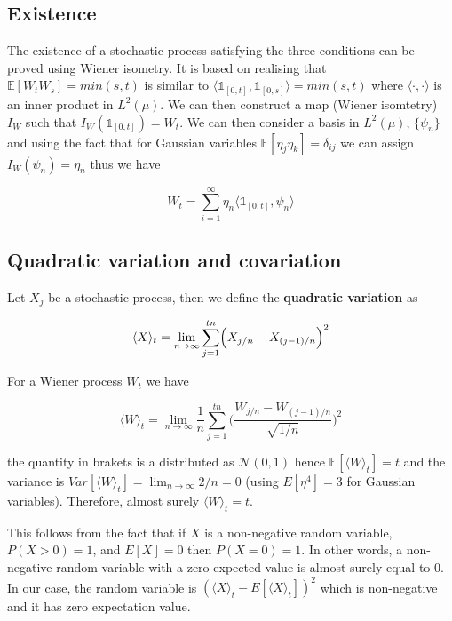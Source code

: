 \documentclass[11pt,a4paper]{article}
\begin{document}
\subsection{Existence}

The existence of a stochastic process satisfying the three conditions can be proved using Wiener isometry. It is based on realising that $\mathbb{E}[W_tW_s] = min(s,t)$ is similar to $\langle \mathds{1}_{[0,t]},\mathds{1}_{[0,s]} \rangle = min(s,t)$ where $\langle \cdot, \cdot\rangle$ is an inner product in $L^2(\mu)$. We can then construct a map (Wiener isomtetry) $I_{W}$ such that $I_W(\mathds{1}_{[0,t]}) = W_t$. We can then consider a basis in $L^2(\mu)$, $\{\psi_n\}$ and using the fact that for Gaussian variables $\mathbb{E}[\eta_j \eta_k] = \delta_{ij}$ we can assign $I_W(\psi_n) = \eta_n$ thus we have

\begin{equation}
    W_t = \sum_{i=1}^{\infty} \eta_n \langle \mathds{1}_{[0,t]}, \psi_n\rangle
\end{equation}
\subsection{Quadratic variation and covariation}

Let $X_j$ be a stochastic process, then we define the \textbf{quadratic variation} as 

\begin{equation}
    \langle X\rangle_t = \lim_{n \to \infty} \sum_{j=1}^{tn}\Bigl(X_{j/n}-X_{(j-1)/n} \Bigl)^2
\end{equation}

For a Wiener process $W_t$ we have

\begin{equation}
    \langle W \rangle_t = \lim_{n \to \infty} \frac{1}{n}\sum_{j=1}^{tn}\Biggl( \frac{W_{j/n}-W_{(j-1)/n}}{\sqrt{1/n}} \Biggl)^2    
\end{equation}

the quantity in brakets is a distributed as $\mathcal{N}(0,1)$ hence $\mathbb{E}[\langle W \rangle_t] = t$ and the variance is $Var[\langle W \rangle_t] = \lim_{n \to \infty}2/n = 0$ (using $E[\eta^4]=3$ for Gaussian variables). Therefore, almost surely $\langle W \rangle_t = t$. 

This follows from the fact that if $X$ is a non-negative random variable, $P(X>0) = 1$, and $E[X] = 0$ then $P(X=0)=1$. In other words, a non-negative random variable with a zero expected value is almost surely equal to $0$. In our case, the random variable is $(\langle X \rangle_t-E[\langle X \rangle_t])^2$ which is non-negative and it has zero expectation value.
\end{document}

